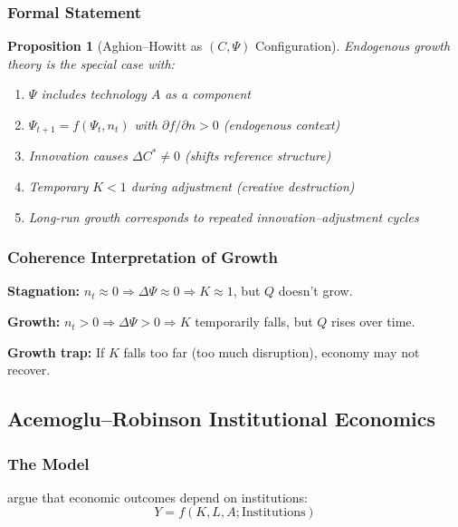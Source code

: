 \documentclass[12pt,a4paper]{article}
\newtheorem{proposition}[theorem]{Proposition}
\begin{document}
\subsubsection{Formal Statement}

\begin{proposition}[Aghion--Howitt as $(C, \Psi)$ Configuration]
Endogenous growth theory is the special case with:
\begin{enumerate}
  \item $\Psi$ includes technology $A$ as a component
  \item $\Psi_{t+1} = f(\Psi_t, n_t)$ with $\partial f / \partial n > 0$ (endogenous context)
  \item Innovation causes $\Delta C^* \neq 0$ (shifts reference structure)
  \item Temporary $K < 1$ during adjustment (creative destruction)
  \item Long-run growth corresponds to repeated innovation--adjustment cycles
\end{enumerate}
\end{proposition}

\subsubsection{Coherence Interpretation of Growth}

\textbf{Stagnation:} $n_t \approx 0 \Rightarrow \Delta \Psi \approx 0 \Rightarrow K \approx 1$, but $Q$ doesn't grow.

\textbf{Growth:} $n_t > 0 \Rightarrow \Delta \Psi > 0 \Rightarrow K$ temporarily falls, but $Q$ rises over time.

\textbf{Growth trap:} If $K$ falls too far (too much disruption), economy may not recover.

\subsection{Acemoglu--Robinson Institutional Economics}
\label{app:acemoglurobbinson}

\subsubsection{The Model}

\citet{acemoglu} argue that economic outcomes depend on institutions:
\begin{equation}
  Y = f(K, L, A; \text{Institutions})
\end{equation}
\end{document}
